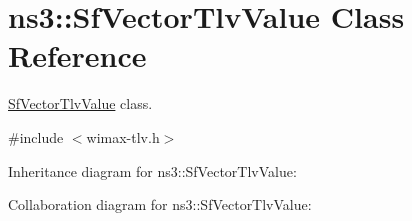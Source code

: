 \hypertarget{classns3_1_1SfVectorTlvValue}{}\section{ns3\+:\+:Sf\+Vector\+Tlv\+Value Class Reference}
\label{classns3_1_1SfVectorTlvValue}


\hyperlink{classns3_1_1SfVectorTlvValue}{Sf\+Vector\+Tlv\+Value} class.  




{\ttfamily \#include $<$wimax-\/tlv.\+h$>$}



Inheritance diagram for ns3\+:\+:Sf\+Vector\+Tlv\+Value\+:


Collaboration diagram for ns3\+:\+:Sf\+Vector\+Tlv\+Value\+:
